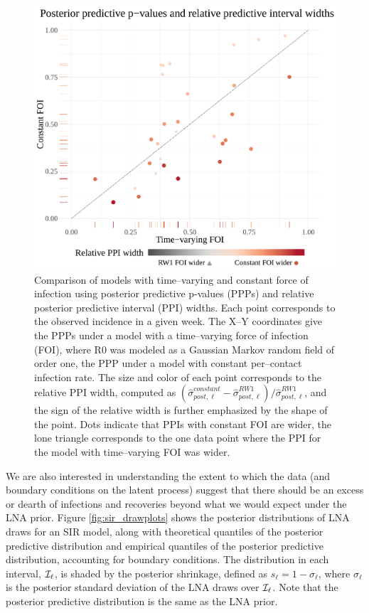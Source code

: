 \begin{figure}[htbp]
	\centering
	\includegraphics[width=0.85\linewidth]{figures/sinfoi_ppi_comp}
	\caption[Model comparison with posterior predictive p-values and relative predictive interval widths.]{Comparison of models with time--varying and constant force of infection using posterior predictive p-values (PPPs) and relative posterior predictive interval (PPI) widths. Each point corresponds to the observed incidence in a given week. The X--Y coordinates give the PPPs under a model with a time--varying force of infection (FOI), where R0 was modeled as a Gaussian Markov random field of order one, the PPP under a model with constant per--contact infection rate. The size and color of each point corresponds to the relative PPI width, computed as $ (\widehat{\sigma}_{post,\ell}^{constant} - \widehat{\sigma}_{post,\ell}^{RW1})/\widehat{\sigma}_{post,\ell}^{RW1} $, and the sign of the relative width is further emphasized by the shape of the point. Dots indicate that PPIs with constant FOI are wider, the lone triangle corresponds to the one data point where the PPI for the model with time--varying FOI was wider.}
	\label{fig:sinfoi_ppi_comp_diag}
\end{figure}

We are also interested in understanding the extent to which the data (and boundary conditions on the latent process) suggest that there should be an excess or dearth of infections and recoveries beyond what we would expect under the LNA prior. Figure \ref{fig:sir_drawplots} shows the posterior distributions of LNA draws for an SIR model, along with theoretical quantiles of the posterior predictive distribution and empirical quantiles of the posterior predictive distribution, accounting for boundary conditions. The distribution in each interval, $ \mathcal{I}_\ell $, is shaded by the posterior shrinkage, defined as $ s_\ell = 1 - \sigma_\ell$, where $ \sigma_\ell $ is the posterior standard deviation of the LNA draws over $ \mathcal{I}_\ell $. Note that the posterior predictive distribution is the same as the LNA prior.

